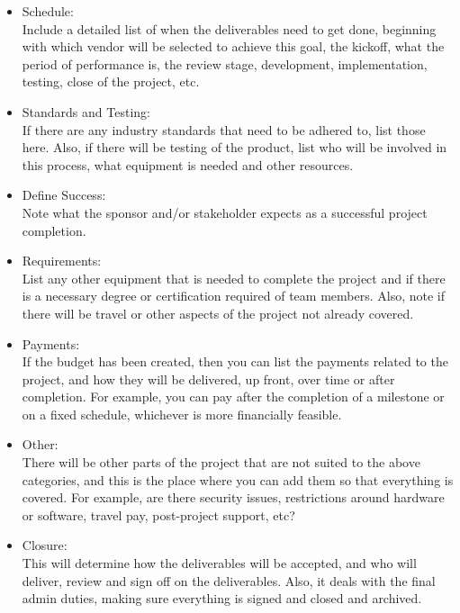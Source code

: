 \documentclass{article}
\begin{document}
\begin{itemize}
  \item  Schedule:\\ Include a detailed list of when the deliverables need to get done, beginning with which vendor will be selected to achieve this goal, the kickoff, what the period of performance is, the review stage, development, implementation, testing, close of the project, etc.
  \item  Standards and Testing:\\ If there are any industry standards that need to be adhered to, list those here. Also, if there will be testing of the product, list who will be involved in this process, what equipment is needed and other resources.
  \item  Define Success:\\ Note what the sponsor and/or stakeholder expects as a successful project completion.
  \item  Requirements:\\ List any other equipment that is needed to complete the project and if there is a necessary degree or certification required of team members. Also, note if there will be travel or other aspects of the project not already covered.
  \item  Payments:\\ If the budget has been created, then you can list the payments related to the project, and how they will be delivered, up front, over time or after completion. For example, you can pay after the completion of a milestone or on a fixed schedule, whichever is more financially feasible.
  \item  Other:\\ There will be other parts of the project that are not suited to the above categories, and this is the place where you can add them so that everything is covered. For example, are there security issues, restrictions around hardware or software, travel pay, post-project support, etc?
  \item  Closure:\\ This will determine how the deliverables will be accepted, and who will deliver, review and sign off on the deliverables. Also, it deals with the final admin duties, making sure everything is signed and closed and archived.
\end{itemize}
\end{document}
